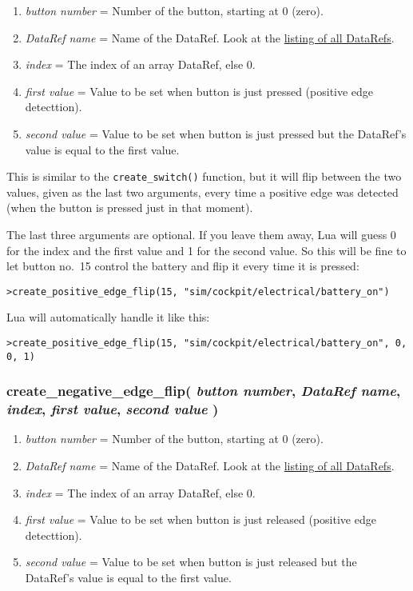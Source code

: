 \documentclass[11pt,parskip=half,a4paper]{scrartcl}
\begin{document}
\begin{enumerate}
	\item \emph{button number} = Number of the button, starting at 0 (zero).
	\item \emph{DataRef name} = Name of the DataRef. Look at the \href{http://www.xsquawkbox.net/xpsdk/docs/DataRefs.html}{listing of all DataRefs}.
	\item \emph{index} = The index of an array DataRef, else 0.
	\item \emph{first value} = Value to be set when button is just pressed (positive edge detecttion).
	\item \emph{second value} = Value to be set when button is just pressed but the DataRef's value is equal to the first value.
\end{enumerate}

This is similar to the \verb|create_switch()| function, but it will flip between the two values, given as the last two arguments, every time a positive edge was detected (when the button is pressed just in that moment).

The last three arguments are optional. If you leave them away, Lua will guess 0 for the index and the first value and 1 for the second value. So this will be fine to let button no.~15 control the battery and flip it every time it is pressed:

\verb|>create_positive_edge_flip(15, "sim/cockpit/electrical/battery_on")|

Lua will automatically handle it like this:

\verb|>create_positive_edge_flip(15, "sim/cockpit/electrical/battery_on", 0, 0, 1)|


\subsubsection{create\_negative\_edge\_flip( \emph{button number}, \emph{DataRef name}, \emph{index}, \emph{first value}, \emph{second value} )}

\begin{enumerate}
	\item \emph{button number} = Number of the button, starting at 0 (zero).
	\item \emph{DataRef name} = Name of the DataRef. Look at the \href{http://www.xsquawkbox.net/xpsdk/docs/DataRefs.html}{listing of all DataRefs}.
	\item \emph{index} = The index of an array DataRef, else 0.
	\item \emph{first value} = Value to be set when button is just released (positive edge detecttion).
	\item \emph{second value} = Value to be set when button is just released but the DataRef's value is equal to the first value.
\end{enumerate}
\end{document}
